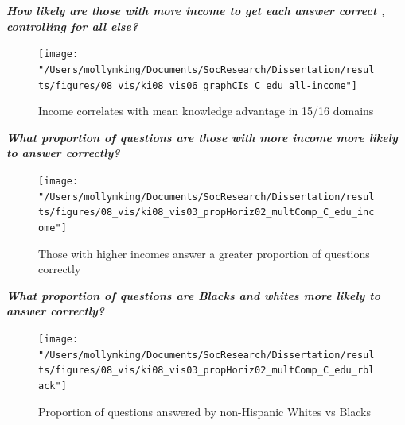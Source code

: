 \documentclass[]{article}
\begin{document}
\emph{\textbf{How likely are those with more income to get each answer correct , controlling for all else?}}
\begin{figure}[ht]
    \begin{center}
      \texttt{[image: "/Users/mollymking/Documents/SocResearch/Dissertation/results/figures/08\_vis/ki08\_vis06\_graphCIs\_C\_edu\_all-income"]}
      \caption{Income correlates with mean knowledge advantage in 15/16 domains}
    \end{center}
\end{figure}

\emph{\textbf{What proportion of questions are those with more income more likely to answer correctly?}}
\begin{figure}[ht]
    \begin{center}
      \texttt{[image: "/Users/mollymking/Documents/SocResearch/Dissertation/results/figures/08\_vis/ki08\_vis03\_propHoriz02\_multComp\_C\_edu\_income"]}
      \caption{Those with higher incomes answer a greater proportion of questions correctly}
    \end{center}
\end{figure}

\emph{\textbf{What proportion of questions are Blacks and whites more likely to answer correctly?}}
\begin{figure}[ht]
    \begin{center}
      \texttt{[image: "/Users/mollymking/Documents/SocResearch/Dissertation/results/figures/08\_vis/ki08\_vis03\_propHoriz02\_multComp\_C\_edu\_rblack"]}
      \caption{Proportion of questions answered by non-Hispanic Whites vs Blacks}
    \end{center}
\end{figure}

\newpage
\end{document}
